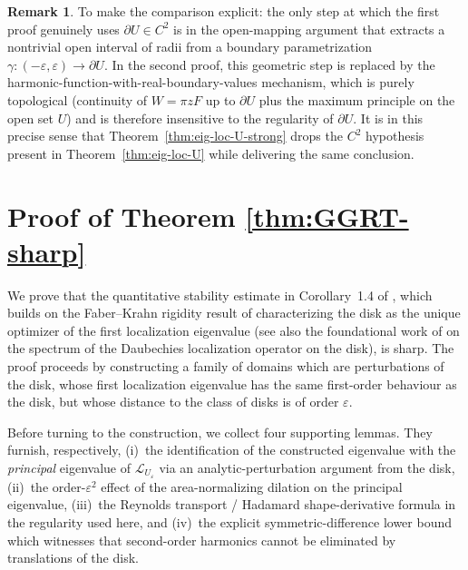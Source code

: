\documentclass[a4paper,11pt,reqno]{amsart}
\numberwithin{equation}{section}
\theoremstyle{plain} %
\theoremstyle{definition} %
\newtheorem{remark}{Remark}[section]
\theoremstyle{remark}
\begin{document}
\begin{remark}
To make the comparison explicit: the only step at which the first proof
genuinely uses \(\partial U\in C^2\) is in the open-mapping argument that
extracts a nontrivial open interval of radii from a boundary parametrization
\(\gamma:(-\varepsilon,\varepsilon)\to\partial U\). In the second proof, this
geometric step is replaced by the harmonic-function-with-real-boundary-values
mechanism, which is purely topological (continuity of \(W=\pi zF\) up to
\(\partial U\) plus the maximum principle on the open set \(U\)) and is
therefore insensitive to the regularity of \(\partial U\). It is in this
precise sense that Theorem~\ref{thm:eig-loc-U-strong} drops the \(C^2\)
hypothesis present in Theorem~\ref{thm:eig-loc-U} while delivering the same
conclusion.
\end{remark}


\section{Proof of Theorem \ref{thm:GGRT-sharp}}\label{sec:GGRT-sharp}

We prove that the quantitative stability estimate in Corollary~1.4 of
\cite{Gomez-Guerra-Ramos-Tilli}, which builds on the Faber--Krahn rigidity
result of \cite{Nicola-Tilli} characterizing the disk as the unique optimizer
of the first localization eigenvalue (see also the foundational work of
\cite{Daubechies} on the spectrum of the Daubechies localization operator on
the disk), is sharp. The proof proceeds by constructing a family of domains
which are perturbations of the disk, whose first localization eigenvalue has
the same first-order behaviour as the disk, but whose distance to the class of
disks is of order $\varepsilon$.

Before turning to the construction, we collect four supporting lemmas. They
furnish, respectively, (i)~the identification of the constructed eigenvalue
with the \emph{principal} eigenvalue of \(\mathcal L_{U_\varepsilon}\) via an
analytic-perturbation argument from the disk, (ii)~the
order-\(\varepsilon^2\) effect of the area-normalizing dilation on the
principal eigenvalue, (iii)~the Reynolds transport / Hadamard
shape-derivative formula in the regularity used here, and (iv)~the explicit
symmetric-difference lower bound which witnesses that second-order harmonics
cannot be eliminated by translations of the disk.
\end{document}
